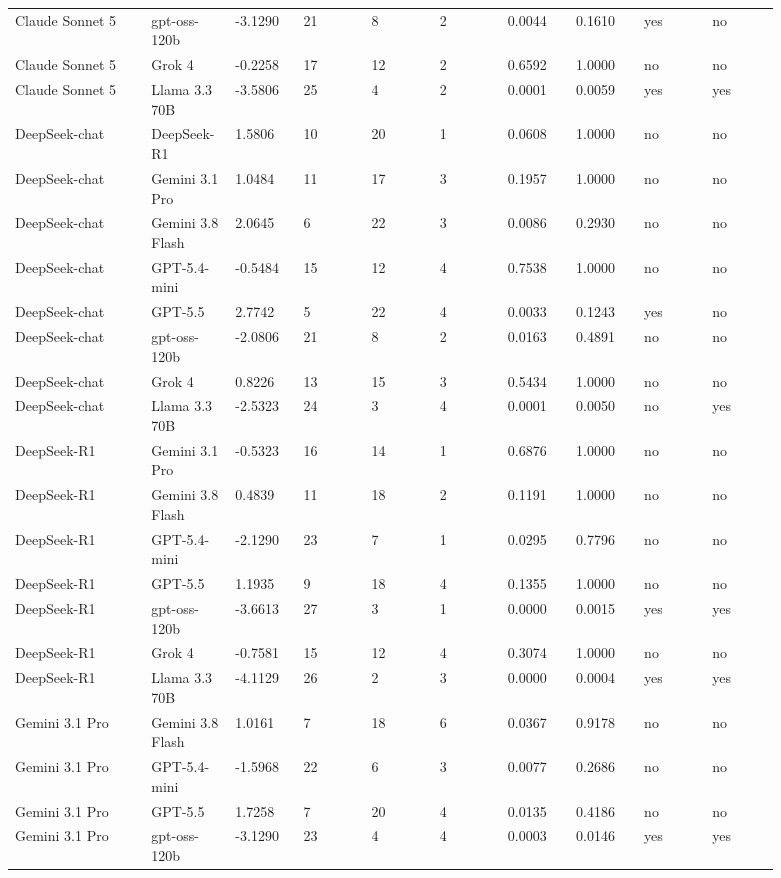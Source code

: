 \begin{landscape}
\begin{longtable}{p{0.162\linewidth}p{0.081\linewidth}p{0.081\linewidth}p{0.081\linewidth}p{0.081\linewidth}p{0.081\linewidth}p{0.081\linewidth}p{0.081\linewidth}p{0.081\linewidth}p{0.081\linewidth}}
Claude Sonnet 5 & gpt-oss-120b & -3.1290 & 21 & 8 & 2 & 0.0044 & 0.1610 & yes & no \\
Claude Sonnet 5 & Grok 4 & -0.2258 & 17 & 12 & 2 & 0.6592 & 1.0000 & no & no \\
Claude Sonnet 5 & Llama 3.3 70B & -3.5806 & 25 & 4 & 2 & 0.0001 & 0.0059 & yes & yes \\
DeepSeek-chat & DeepSeek-R1 & 1.5806 & 10 & 20 & 1 & 0.0608 & 1.0000 & no & no \\
DeepSeek-chat & Gemini 3.1 Pro & 1.0484 & 11 & 17 & 3 & 0.1957 & 1.0000 & no & no \\
DeepSeek-chat & Gemini 3.8 Flash & 2.0645 & 6 & 22 & 3 & 0.0086 & 0.2930 & no & no \\
DeepSeek-chat & GPT-5.4-mini & -0.5484 & 15 & 12 & 4 & 0.7538 & 1.0000 & no & no \\
DeepSeek-chat & GPT-5.5 & 2.7742 & 5 & 22 & 4 & 0.0033 & 0.1243 & yes & no \\
DeepSeek-chat & gpt-oss-120b & -2.0806 & 21 & 8 & 2 & 0.0163 & 0.4891 & no & no \\
DeepSeek-chat & Grok 4 & 0.8226 & 13 & 15 & 3 & 0.5434 & 1.0000 & no & no \\
DeepSeek-chat & Llama 3.3 70B & -2.5323 & 24 & 3 & 4 & 0.0001 & 0.0050 & no & yes \\
DeepSeek-R1 & Gemini 3.1 Pro & -0.5323 & 16 & 14 & 1 & 0.6876 & 1.0000 & no & no \\
DeepSeek-R1 & Gemini 3.8 Flash & 0.4839 & 11 & 18 & 2 & 0.1191 & 1.0000 & no & no \\
DeepSeek-R1 & GPT-5.4-mini & -2.1290 & 23 & 7 & 1 & 0.0295 & 0.7796 & no & no \\
DeepSeek-R1 & GPT-5.5 & 1.1935 & 9 & 18 & 4 & 0.1355 & 1.0000 & no & no \\
DeepSeek-R1 & gpt-oss-120b & -3.6613 & 27 & 3 & 1 & 0.0000 & 0.0015 & yes & yes \\
DeepSeek-R1 & Grok 4 & -0.7581 & 15 & 12 & 4 & 0.3074 & 1.0000 & no & no \\
DeepSeek-R1 & Llama 3.3 70B & -4.1129 & 26 & 2 & 3 & 0.0000 & 0.0004 & yes & yes \\
Gemini 3.1 Pro & Gemini 3.8 Flash & 1.0161 & 7 & 18 & 6 & 0.0367 & 0.9178 & no & no \\
Gemini 3.1 Pro & GPT-5.4-mini & -1.5968 & 22 & 6 & 3 & 0.0077 & 0.2686 & no & no \\
Gemini 3.1 Pro & GPT-5.5 & 1.7258 & 7 & 20 & 4 & 0.0135 & 0.4186 & no & no \\
Gemini 3.1 Pro & gpt-oss-120b & -3.1290 & 23 & 4 & 4 & 0.0003 & 0.0146 & yes & yes \\

\end{longtable}
\end{landscape}
